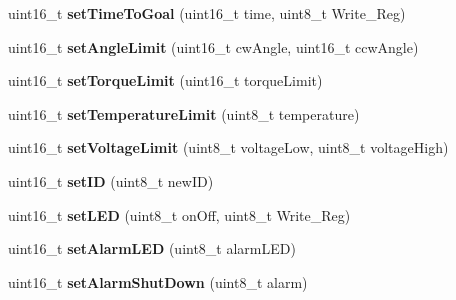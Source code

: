 \begin{DoxyCompactItemize}
\item 
uint16\+\_\+t {\bfseries set\+Time\+To\+Goal} (uint16\+\_\+t time, uint8\+\_\+t Write\+\_\+\+Reg)\hypertarget{classCytron__G15__Servo_a1f6df0bc7fcb699c912243dc085bee78}{}\label{classCytron__G15__Servo_a1f6df0bc7fcb699c912243dc085bee78}

\item 
uint16\+\_\+t {\bfseries set\+Angle\+Limit} (uint16\+\_\+t cw\+Angle, uint16\+\_\+t ccw\+Angle)\hypertarget{classCytron__G15__Servo_a0d0e80189f19d92dd5b10460fae44ec4}{}\label{classCytron__G15__Servo_a0d0e80189f19d92dd5b10460fae44ec4}

\item 
uint16\+\_\+t {\bfseries set\+Torque\+Limit} (uint16\+\_\+t torque\+Limit)\hypertarget{classCytron__G15__Servo_ad80856fdf4e9d2e82cfd1c3a10b0a9ed}{}\label{classCytron__G15__Servo_ad80856fdf4e9d2e82cfd1c3a10b0a9ed}

\item 
uint16\+\_\+t {\bfseries set\+Temperature\+Limit} (uint8\+\_\+t temperature)\hypertarget{classCytron__G15__Servo_af9c32f2d77cdb6d659758e78d817ed85}{}\label{classCytron__G15__Servo_af9c32f2d77cdb6d659758e78d817ed85}

\item 
uint16\+\_\+t {\bfseries set\+Voltage\+Limit} (uint8\+\_\+t voltage\+Low, uint8\+\_\+t voltage\+High)\hypertarget{classCytron__G15__Servo_a9fc409f1a0eac47437bbee8b529118bf}{}\label{classCytron__G15__Servo_a9fc409f1a0eac47437bbee8b529118bf}

\item 
uint16\+\_\+t {\bfseries set\+ID} (uint8\+\_\+t new\+ID)\hypertarget{classCytron__G15__Servo_aeb2650168794532d9958d9d9ea70be71}{}\label{classCytron__G15__Servo_aeb2650168794532d9958d9d9ea70be71}

\item 
uint16\+\_\+t {\bfseries set\+L\+ED} (uint8\+\_\+t on\+Off, uint8\+\_\+t Write\+\_\+\+Reg)\hypertarget{classCytron__G15__Servo_a1bb28ad77469795332be02e8822449e9}{}\label{classCytron__G15__Servo_a1bb28ad77469795332be02e8822449e9}

\item 
uint16\+\_\+t {\bfseries set\+Alarm\+L\+ED} (uint8\+\_\+t alarm\+L\+ED)\hypertarget{classCytron__G15__Servo_aba44b1c07734438c134c15d749600dc8}{}\label{classCytron__G15__Servo_aba44b1c07734438c134c15d749600dc8}

\item 
uint16\+\_\+t {\bfseries set\+Alarm\+Shut\+Down} (uint8\+\_\+t alarm)\hypertarget{classCytron__G15__Servo_aca836247a264b78190d66d08afa9c25c}{}\label{classCytron__G15__Servo_aca836247a264b78190d66d08afa9c25c}


\end{DoxyCompactItemize}
